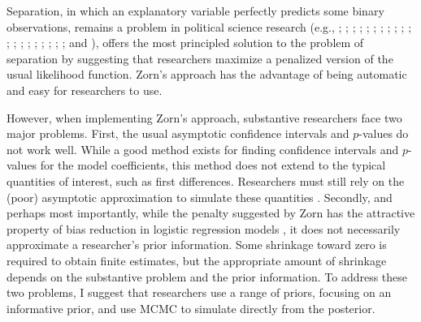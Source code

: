 \documentclass[12pt]{article}
\begin{document}
\newpage
\doublespace

Separation, in which an explanatory variable perfectly predicts some binary observations, remains a problem in political science research (e.g., \citealt{BellMiller2015}; \citealt{Mares2015}; \citealt{ViningWilhelmCollens2015}; \citealt{BrownKaplow2014}; \citealt{BarrilleauxRainey2014};  \citealt{LeemanMares2014}; \citealt{Reiter2014}; \citealt{Weisiger2014}; \citealt{MinozziVolden2013}; \citealt{CedermeanGleditschHug2013}; \citealt{Fuhrmann2012}; \citealt{RoccaSanchezMorin2011}; \citealt{PetersonDrury2011}; \citealt{CoxKousserMcCubbins2010}; \citealt{Ahlquist2010}; \citealt{Rauchhaus2009}; \citealt{SmithFridkin2008}; \citealt{Casellas2008}; \citealt{DesposatoScheiner2008}; \citealt{HellerMershon2008}; and \citealt{DeRouenBercovitch2008}), %
\cite{Zorn2005} offers the most principled solution to the problem of separation by suggesting that researchers maximize a penalized version of the usual likelihood function. Zorn's approach has the advantage of being automatic and easy for researchers to use.

However, when implementing Zorn's approach, substantive researchers face two major problems. First, the usual asymptotic confidence intervals and $p$-values do not work well. While a good method exists for finding confidence intervals and $p$-values for the model coefficients, this method does not extend to the typical quantities of interest, such as first differences. Researchers must still rely on the (poor) asymptotic approximation to simulate these quantities \citep{KingTomzWittenberg2000}.  Secondly, and perhaps most importantly, while the penalty suggested by Zorn has the attractive property of bias reduction in logistic regression models \citep{Firth1993}, it does not necessarily approximate a researcher's prior information. Some shrinkage toward zero is required to obtain finite estimates, but the appropriate amount of shrinkage depends on the substantive problem and the prior information. To address these two problems, I suggest that researchers use a range of priors, focusing on an informative prior, and use MCMC to simulate directly from the posterior.
\end{document}
